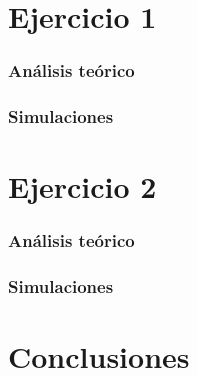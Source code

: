 \documentclass[10pt,a4paper]{article}
\begin{document}
		
	\setcounter{page}{1}

	\part{Ejercicio 1}\label{part:ej1}
		\section{Análisis teórico}\label{sec:teo1}
			
		
		\section{Simulaciones}\label{sec:sim1}
			
		
	\part{Ejercicio 2}\label{part:ej2}
		\section{Análisis teórico}\label{sec:teo2}
			

		\section{Simulaciones}\label{sec:sim2}
			
		
	\part{Conclusiones}\label{part:conclusiones}
		
\end{document}
